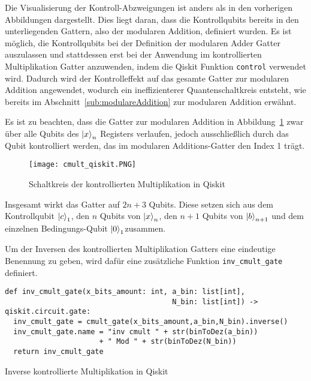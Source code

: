 Die Visualisierung der Kontroll-Abzweigungen ist anders als in den vorherigen Abbildungen dargestellt.
Dies liegt daran, dass die Kontrollqubits bereits in den unterliegenden Gattern, 
also der modularen Addition, 
definiert wurden.
Es ist möglich, die Kontrollqubits bei der Definition der modularen Adder Gatter auszulassen und 
stattdessen erst bei der Anwendung im kontrollierten Multiplikation Gatter anzuwenden, 
indem die Qiskit Funktion \texttt{control} verwendet wird.
Dadurch wird der Kontrolleffekt auf das gesamte Gatter zur modularen Addition angewendet, 
wodurch ein ineffizienterer Quantenschaltkreis entsteht, 
wie bereits im Abschnitt~\ref{sub:modulareAddition} zur modularen Addition erwähnt.

Es ist zu beachten, dass die Gatter zur modularen Addition in Abbildung~\ref{fig:cmult_qiskit} zwar über 
alle Qubits des \(\ket{x}_n\) Registers verlaufen, 
jedoch ausschließlich durch das Qubit kontrolliert werden, 
das im modularen Additions-Gatter den Index 1 trägt.

\begin{figure} [H]
  \centering
  \texttt{[image: cmult\_qiskit.PNG]}
  \caption{Schaltkreis der kontrollierten Multiplikation in Qiskit}
  \label{fig:cmult_qiskit}
\end{figure}

Insgesamt wirkt das Gatter auf \(2n+3\) Qubits.
Diese setzen sich aus dem Kontrollqubit \(\ket{c}_1\), den \(n\) Qubits von \(\ket{x}_n\), 
den \(n+1\) Qubits von \(\ket{b}_{n+1}\) und dem einzelnen Bedingungs-Qubit \(\ket{0}_1\)zusammen.

Um der Inversen des kontrollierten Multiplikation Gatters eine eindeutige Benennung zu geben, 
wird dafür eine zusätzliche Funktion \texttt{inv_cmult_gate} definiert.
\begin{listing}[H]
\begin{verbatim}  
def inv_cmult_gate(x_bits_amount: int, a_bin: list[int],
                                       N_bin: list[int]) -> qiskit.circuit.gate:  
  inv_cmult_gate = cmult_gate(x_bits_amount,a_bin,N_bin).inverse()
  inv_cmult_gate.name = "inv cmult " + str(binToDez(a_bin)) 
                      + " Mod " + str(binToDez(N_bin))
  return inv_cmult_gate
  \end{verbatim}
  \caption{Inverse kontrollierte Multiplikation in Qiskit}
  \label{code:InverseModularMultiplication}
\end{listing}


